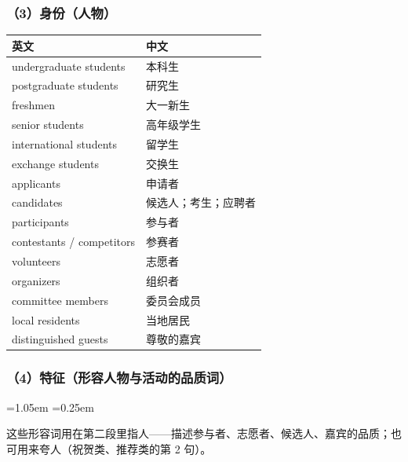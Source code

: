 \documentclass[11pt,a4paper]{ctexart}
\newenvironment{note}{%
  \par\addvspace{5pt}%
  \begin{list}{}{\leftmargin=1.05em \rightmargin=0.25em \listparindent=0pt
    \itemindent=0pt \topsep=0pt \parsep=2pt \itemsep=2pt \partopsep=0pt}%
  \item\relax\small\color{ink}%
}{%
  \end{list}\addvspace{5pt}%
}
\begin{document}
\subsubsection{（3）身份（人物）}

\begin{longtable}{L{9.4cm}L{6.6cm}}
\toprule
\textbf{英文} & \textbf{中文} \\
\midrule
\endhead
\bottomrule
\endlastfoot
undergraduate students & 本科生 \\
postgraduate students & 研究生 \\
freshmen & 大一新生 \\
senior students & 高年级学生 \\
international students & 留学生 \\
exchange students & 交换生 \\
applicants & 申请者 \\
candidates & 候选人；考生；应聘者 \\
participants & 参与者 \\
contestants / competitors & 参赛者 \\
volunteers & 志愿者 \\
organizers & 组织者 \\
committee members & 委员会成员 \\
local residents & 当地居民 \\
distinguished guests & 尊敬的嘉宾 \\
\end{longtable}

\subsubsection{（4）特征（形容人物与活动的品质词）}

\begin{note}
这些形容词用在第二段里指人——描述参与者、志愿者、候选人、嘉宾的品质；也可用来夸人（祝贺类、推荐类的第 2 句）。
\end{note}
\end{document}

